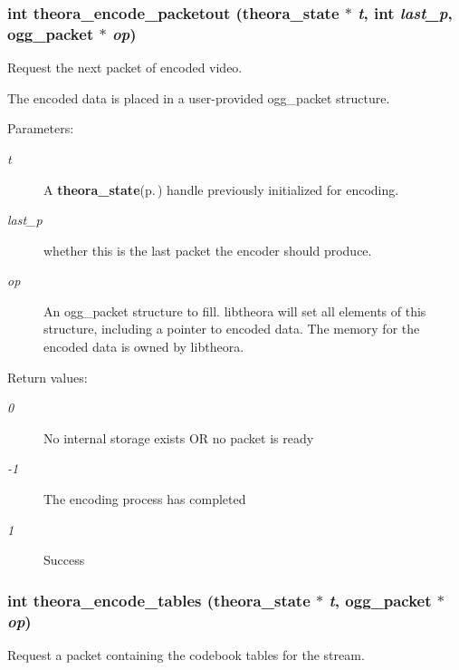 \subsubsection{\setlength{\rightskip}{0pt plus 5cm}int theora\_\-encode\_\-packetout ({\bf theora\_\-state} $\ast$ {\em t}, int {\em last\_\-p}, ogg\_\-packet $\ast$ {\em op})}\label{theora_8h_bd4b6f1eb80929ea318fbaa1d5d7fba3}


Request the next packet of encoded video. 

The encoded data is placed in a user-provided ogg\_\-packet structure. \begin{Desc}
\item[Parameters:]
\begin{description}
\item[{\em t}]A {\bf theora\_\-state}{\rm (p.\,\pageref{structtheora__state})} handle previously initialized for encoding. \item[{\em last\_\-p}]whether this is the last packet the encoder should produce. \item[{\em op}]An ogg\_\-packet structure to fill. libtheora will set all elements of this structure, including a pointer to encoded data. The memory for the encoded data is owned by libtheora. \end{description}
\end{Desc}
\begin{Desc}
\item[Return values:]
\begin{description}
\item[{\em 0}]No internal storage exists OR no packet is ready \item[{\em -1}]The encoding process has completed \item[{\em 1}]Success \end{description}
\end{Desc}
\subsubsection{\setlength{\rightskip}{0pt plus 5cm}int theora\_\-encode\_\-tables ({\bf theora\_\-state} $\ast$ {\em t}, ogg\_\-packet $\ast$ {\em op})}\label{theora_8h_74fcaad3b21a9bfa643f0627ecba96d7}


Request a packet containing the codebook tables for the stream. 

